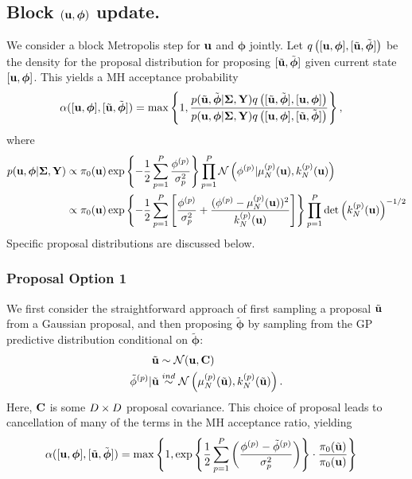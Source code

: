 \documentclass[12pt]{article}
\newcommand{\bphi}{\boldsymbol{\phi}}
\begin{document}
\subsection{Block $(\bpar, \bphi)$ update.}
We consider a block Metropolis step for $\mathbf{u}$ and $\bphi$ jointly. Let $\propDens\left([\bpar, \bphi], [\tilde{\bpar}, \tilde{\bphi}] \right)$ be the density for the proposal distribution for 
proposing $[\tilde{\bpar}, \tilde{\bphi}]$ given current state $[\bpar, \bphi]$. This yields a MH acceptance probability
\begin{align*}
\accProbMH([\bpar, \bphi], [\tilde{\bpar}, \tilde{\bphi}]) 
&= \max\left\{1,  \frac{p(\tilde{\bpar}, \tilde{\bphi}|\CovObs, \stateMat)\propDens\left([\tilde{\bpar}, \tilde{\bphi}], [\bpar, \bphi] \right)}{p(\bpar, \bphi|\CovObs, \stateMat) \propDens\left([\bpar, \bphi], [\tilde{\bpar}, \tilde{\bphi}] \right)} \right\},
\end{align*}
where 
\begin{align*}
p(\bpar, \bphi|\CovObs, \stateMat) 
&\propto \priorDens(\bpar) \exp\left\{-\frac{1}{2} \sum_{\objIdx=1}^{\Nobj} \frac{\indexObj{\phi}}{\sdObs^2_{\objIdx}} \right\} 
 \prod_{\objIdx=1}^{\Nobj} \Gaussian\left(\indexObj{\phi} | \GPMeanPredOut{\Ndesign}{\objIdx}(\bpar), \GPKerPredOut{\Ndesign}{\objIdx}(\bpar)\right) \\
&\propto \priorDens(\bpar) \exp\left\{-\frac{1}{2} \sum_{\objIdx=1}^{\Nobj} \left[\frac{\indexObj{\phi}}{\sdObs^2_{\objIdx}} + \frac{(\indexObj{\phi} - \GPMeanPredOut{\Ndesign}{\objIdx}(\bpar))^2}{\GPKerPredOut{\Ndesign}{\objIdx}(\bpar)} \right]  \right\}
	\prod_{\objIdx=1}^{\Nobj} \det\left(\GPKerPredOut{\Ndesign}{\objIdx}(\bpar)\right)^{-1/2}
\end{align*}
Specific proposal distributions are discussed below. 

\subsubsection{Proposal Option 1}
We first consider the straightforward approach of first sampling a proposal $\tilde{\mathbf{u}}$ from a Gaussian proposal, and then proposing $\tilde{\bphi}$ by sampling from the 
GP predictive distribution conditional on $\tilde{\bphi}$: 
\begin{align*}
\tilde{\mathbf{u}} &\sim \mathcal{N}(\mathbf{u}, \mathbf{C}) \\
{\tilde{\phi}}^{(p)}|\tilde{\mathbf{u}} &\overset{ind}{\sim} \mathcal{N}\left(\mu_{N}^{(p)}(\tilde{\mathbf{u}}), k_{N}^{(p)}(\tilde{\mathbf{u}})\right).
\end{align*}
Here, $\mathbf{C}$ is some $D \times D$ proposal covariance. This choice of proposal leads to cancellation of many of the terms in the MH acceptance ratio, yielding
\begin{align*}
\accProbMH([\bpar, \bphi], [\tilde{\bpar}, \tilde{\bphi}]) 
&= \max\left\{1, \exp\left\{\frac{1}{2} \sum_{\objIdx=1}^{\Nobj} \left(\frac{ \indexObj{\phi} - \indexObj{\tilde{\phi}}}{\sdObs^2_{\objIdx}}\right)\right\} \cdot \frac{\priorDens(\tilde{\bpar})}{\priorDens(\bpar)} \right\}
\end{align*}
\end{document}
